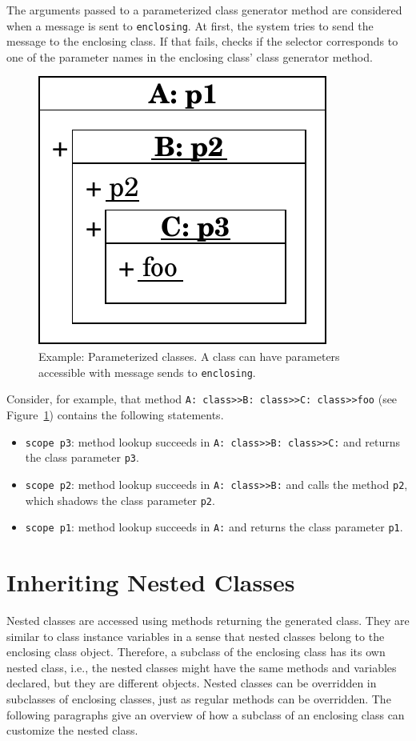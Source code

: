 The arguments passed to a parameterized class generator method are considered when a message is sent to \texttt{enclosing}. At first, the system tries to send the message to the enclosing class. If that fails, \msname checks if the selector corresponds to one of the parameter names in the enclosing class' class generator method.

\begin{figure}
	\includegraphics[scale=0.75]{nested_notation_params.pdf}
	\centering
	\caption[Example: Parameterized classes]{Example: Parameterized classes. A class can have parameters accessible with message sends to \texttt{enclosing}.}
	\label{fig:concept_param_classes}
\end{figure}

Consider, for example, that method \texttt{A: class>>B: class>>C: class>>foo} (see Figure~\ref{fig:concept_param_classes}) contains the following statements.
\begin{itemize}
	\item \texttt{scope p3}: method lookup succeeds in \texttt{A: class>>B: class>>C:} and returns the class parameter \texttt{p3}.
	\item \texttt{scope p2}: method lookup succeeds in \texttt{A: class>>B:} and calls the method \texttt{p2}, which shadows the class parameter \texttt{p2}.
	\item \texttt{scope p1}: method lookup succeeds in \texttt{A:} and returns the class parameter \texttt{p1}.
\end{itemize}

\section{Inheriting Nested Classes}
\label{sec:concept_inh_nested_cl}
Nested classes are accessed using methods returning the generated class. They are similar to class instance variables in a sense that nested classes belong to the enclosing class object. Therefore, a subclass of the enclosing class has its own nested class, i.e., the nested classes might have the same methods and variables declared, but they are different objects. Nested classes can be overridden in subclasses of enclosing classes, just as regular methods can be overridden. The following paragraphs give an overview of how a subclass of an enclosing class can customize the nested class.

